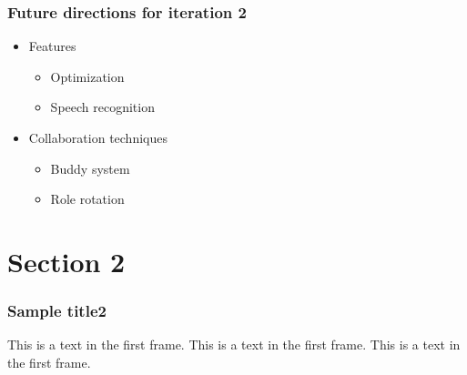 \documentclass{beamer}
\begin{document}
  \begin{frame}
  \frametitle{Future directions for iteration 2}
  \begin{itemize}
   \item Features
    \begin{itemize}
     \item Optimization
     \item Speech recognition
    \end{itemize}
   \item Collaboration techniques
    \begin{itemize}
     \item Buddy system
     \item Role rotation
    \end{itemize}
  \end{itemize}
  \end{frame}



  \section{Section 2}
  \begin{frame}
  \frametitle{Sample title2}
  This is a text in the first frame. This is a text in the first frame. This is a text in the first frame.
  \end{frame}

  
\end{document}
